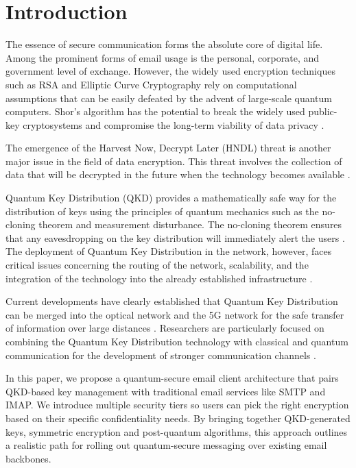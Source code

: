 \documentclass[conference]{IEEEtran}
\begin{document}
\section{Introduction}
The essence of secure communication forms the absolute core of digital life. Among the prominent forms of email usage is the personal, corporate, and government level of exchange. However, the widely used encryption techniques such as RSA and Elliptic Curve Cryptography rely on computational assumptions that can be easily defeated by the advent of large-scale quantum computers. Shor's algorithm has the potential to break the widely used public-key cryptosystems and compromise the long-term viability of data privacy \cite{b1}.

The emergence of the Harvest Now, Decrypt Later (HNDL) threat is another major issue in the field of data encryption. This threat involves the collection of data that will be decrypted in the future when the technology becomes available \cite{b5}.

Quantum Key Distribution (QKD) provides a mathematically safe way for the distribution of keys using the principles of quantum mechanics such as the no-cloning theorem and measurement disturbance. The no-cloning theorem ensures that any eavesdropping on the key distribution will immediately alert the users \cite{b5}. The deployment of Quantum Key Distribution in the network, however, faces critical issues concerning the routing of the network, scalability, and the integration of the technology into the already established infrastructure \cite{b2}.

Current developments have clearly established that Quantum Key Distribution can be merged into the optical network and the 5G network for the safe transfer of information over large distances \cite{b8}. Researchers are particularly focused on combining the Quantum Key Distribution technology with classical and quantum communication for the development of stronger communication channels \cite{b10}.

In this paper, we propose a quantum-secure email client architecture that pairs QKD-based key management with traditional email services like SMTP and IMAP. We introduce multiple security tiers so users can pick the right encryption based on their specific confidentiality needs. By bringing together QKD-generated keys, symmetric encryption and post-quantum algorithms, this approach outlines a realistic path for rolling out quantum-secure messaging over existing email backbones.
\end{document}
